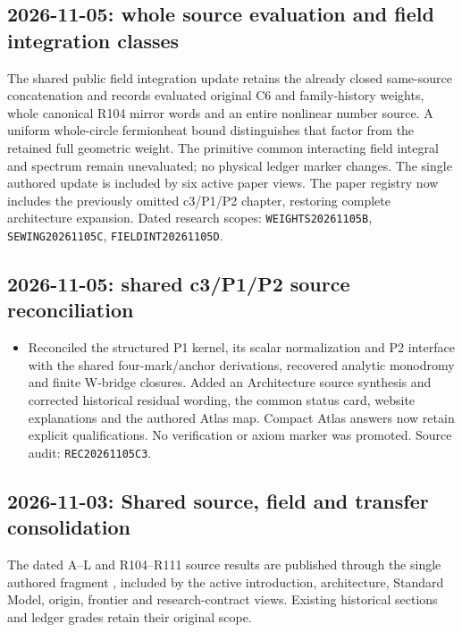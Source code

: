 \subsection*{2026-11-05: whole source evaluation and field integration classes}
The shared public field integration update retains the already closed
same-source concatenation and records evaluated original C6 and family-history
weights, whole canonical R104 mirror words and an entire nonlinear number
source. A uniform whole-circle fermionheat bound distinguishes that factor
from the retained full geometric weight. The primitive common interacting
field integral and spectrum remain unevaluated; no physical ledger marker
changes. The single authored update is included by six active paper views.
The paper registry now includes the previously omitted c3/P1/P2 chapter,
restoring complete architecture expansion. Dated research scopes:
\texttt{WEIGHTS20261105B}, \texttt{SEWING20261105C}, \texttt{FIELDINT20261105D}.

\subsection*{2026-11-05: shared c3/P1/P2 source reconciliation}
\begin{itemize}
\item Reconciled the structured P1 kernel, its scalar normalization and P2 interface
with the shared four-mark/anchor derivations, recovered analytic monodromy and
finite W-bridge closures. Added an Architecture source synthesis and corrected
historical residual wording, the common status card, website explanations and
the authored Atlas map. Compact Atlas answers now retain explicit qualifications.
No verification or axiom marker was promoted. Source audit: \texttt{REC20261105C3}.
\end{itemize}

\subsection*{2026-11-03: Shared source, field and transfer consolidation}
The dated A--L and R104--R111 source results are published through the
single authored fragment
,
included by the active introduction, architecture, Standard Model,
origin, frontier and research-contract views. Existing historical
sections and ledger grades retain their original scope.

